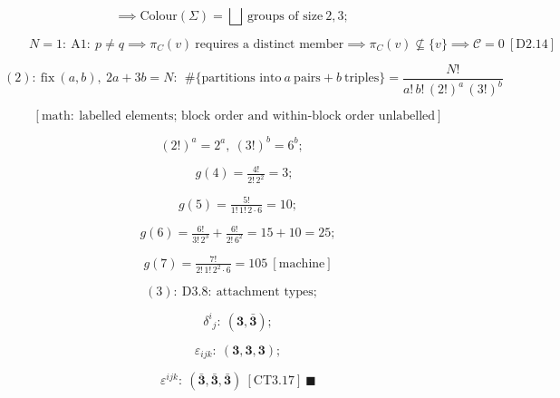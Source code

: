 \begin{corollary}
\[
\implies\mathrm{Colour}(\Sigma)=\bigsqcup\ \text{groups of size}\ 2,3;
\]

\[
\qquad N=1:\ \mathrm{A1}:\ p\ne q\implies\pi_C(v)\ \text{requires a distinct member}\implies\pi_C(v)\not\subseteq\{v\}\implies\mathcal C=0\ [\mathrm{D2.14}]
\]

\[
(2):\ \text{fix}\ (a,b),\ 2a+3b=N:\ \ \#\{\text{partitions into}\ a\ \text{pairs}+b\ \text{triples}\}=\frac{N!}{a!\,b!\,(2!)^{a}\,(3!)^{b}}
\]

\[
\quad [\text{math}:\ \text{labelled elements; block order and within-block order unlabelled}]
\]

\[
(2!)^{a}=2^{a},\ (3!)^{b}=6^{b};
\]

\[
\qquad g(4)=\tfrac{4!}{2!\,2^{2}}=3;
\]

\[
\quad g(5)=\tfrac{5!}{1!\,1!\,2\cdot6}=10;
\]

\[
\quad g(6)=\tfrac{6!}{3!\,2^{3}}+\tfrac{6!}{2!\,6^{2}}=15+10=25;
\]

\[
\quad g(7)=\tfrac{7!}{2!\,1!\,2^{2}\cdot6}=105\ [\text{machine}]
\]

\[
(3):\ \mathrm{D3.8}:\ \text{attachment types};
\]

\[
\quad\delta^{i}{}_{j}:\ (\mathbf3,\bar{\mathbf3});
\]

\[
\quad\varepsilon_{ijk}:\ (\mathbf3,\mathbf3,\mathbf3);
\]

\[
\quad\varepsilon^{ijk}:\ (\bar{\mathbf3},\bar{\mathbf3},\bar{\mathbf3})\ [\mathrm{CT3.17}]\ \blacksquare
\]

\end{corollary}

